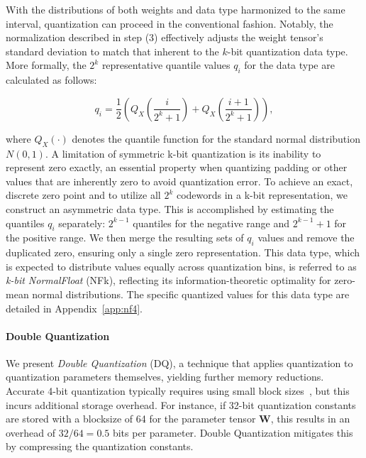 With the distributions of both weights and data type harmonized to the same interval, quantization can proceed in the conventional fashion. Notably, the normalization described in step (3) effectively adjusts the weight tensor's standard deviation to match that inherent to the $k$-bit quantization data type. More formally, the $2^k$ representative quantile values $q_i$ for the data type are calculated as follows:

\begin{equation}
q_i  = \frac{1}{2}\left( Q_X\left(\frac{i}{2^k+1}\right) + Q_X\left(\frac{i+1}{2^k+1}\right)\right),
\end{equation}

where $Q_X(\cdot)$ denotes the quantile function for the standard normal distribution $N(0,1)$. A limitation of symmetric k-bit quantization is its inability to represent zero exactly, an essential property when quantizing padding or other values that are inherently zero to avoid quantization error. To achieve an exact, discrete zero point and to utilize all $2^k$ codewords in a k-bit representation, we construct an asymmetric data type. This is accomplished by estimating the quantiles $q_i$ separately: $2^{k-1}$ quantiles for the negative range and $2^{k-1}+1$ for the positive range. We then merge the resulting sets of $q_i$ values and remove the duplicated zero, ensuring only a single zero representation. This data type, which is expected to distribute values equally across quantization bins, is referred to as \emph{k-bit NormalFloat} (NFk), reflecting its information-theoretic optimality for zero-mean normal distributions. The specific quantized values for this data type are detailed in Appendix~\ref{app:nf4}.

\paragraph{Double Quantization{}}
We present \emph{Double Quantization} (DQ), a technique that applies quantization to quantization parameters themselves, yielding further memory reductions. Accurate 4-bit quantization typically requires using small block sizes~\citep{dettmers2022case}, but this incurs additional storage overhead. For instance, if 32-bit quantization constants are stored with a blocksize of 64 for the parameter tensor $\mathbf{W}$, this results in an overhead of $32/64 = 0.5$ bits per parameter. Double Quantization mitigates this by compressing the quantization constants.

